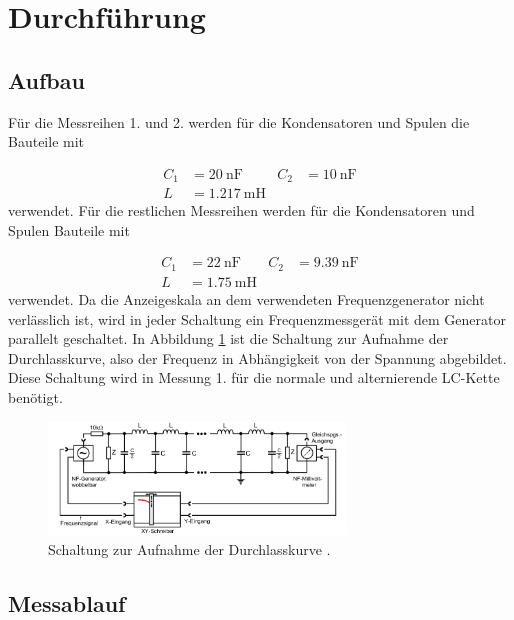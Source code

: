  \section{Durchführung}
\label{sec:Durchführung}


\subsection{Aufbau}

Für die Messreihen 1. und 2. werden für die Kondensatoren und Spulen die
Bauteile mit

\begin{align}
  C_1 & = \SI{20}{\nano\F} & C_2 & = \SI{10}{\nano\F} \\
  L & = \SI{1.217}{\milli\henry}
\end{align}
verwendet. Für die restlichen Messreihen werden für die Kondensatoren und Spulen
Bauteile mit

\begin{align}
  C_1 & = \SI{22}{\nano\F} & C_2 & = \SI{9.39}{\nano\F} \\
  L & = \SI{1.75}{\milli\henry}
\end{align}
verwendet.
Da die Anzeigeskala an dem verwendeten Frequenzgenerator nicht verlässlich ist,
wird in jeder Schaltung ein Frequenzmessgerät mit dem Generator parallelt
geschaltet.
In Abbildung \ref{fig:DK} ist die Schaltung zur Aufnahme der Durchlasskurve,
also der Frequenz in Abhängigkeit von der Spannung abgebildet.
Diese Schaltung wird in Messung 1. für die normale und
alternierende LC-Kette benötigt.

\begin{figure}
  \centering
  \includegraphics[height=3cm]{DurchlasskurveLCkette.png}
  \caption{Schaltung zur Aufnahme der Durchlasskurve \cite{anleitung}.}
  \label{fig:DK}
\end{figure}


\subsection{Messablauf}

